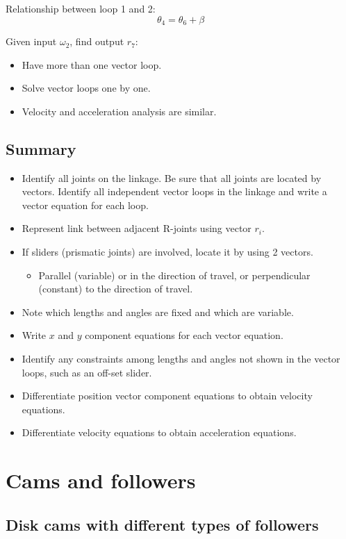 \documentclass[11pt]{article}
\begin{document}
Relationship between loop 1 and 2:
\[\theta_4 = \theta_6 + \beta\]

Given input \(\omega_2\), find output \(r_7\):
\begin{itemize}
\item Have more than one vector loop.
\item Solve vector loops one by one.
\item Velocity and acceleration analysis are similar.
\end{itemize}

 \newpage
\subsection{Summary}
\label{sec:org53e75fa}
\begin{itemize}
\item Identify all joints on the linkage. Be sure that all joints are located by vectors. Identify all independent vector loops in the linkage and write a vector equation for each loop.
\item Represent link between adjacent R-joints using vector \(r_i\).
\item If sliders (prismatic joints) are involved, locate it by using 2 vectors.
\begin{itemize}
\item Parallel (variable) or in the direction of travel, or perpendicular (constant) to the direction of travel.
\end{itemize}
\item Note which lengths and angles are fixed and which are variable.
\item Write \(x\) and \(y\) component equations for each vector equation.
\item Identify any constraints among lengths and angles not shown in the vector loops, such as an off-set slider.
\item Differentiate position vector component equations to obtain velocity equations.
\item Differentiate velocity equations to obtain acceleration equations.
\end{itemize}
\section{Cams and followers}
\label{sec:org770c1fc}

\subsection{Disk cams with different types of followers}
\label{sec:org9d3e0c9}
\end{document}
